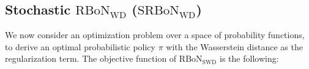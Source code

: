 





\subsection{Stochastic $\mathrm{RBoN}_{\mathrm{WD}}$ ($\mathrm{SRBoN}_{\mathrm{WD}}$)}\label{propose:WD}
We now consider an optimization problem over a space of probability functions, to derive an optimal probabilistic policy $\pi$ with the Wasserstein distance as the regularization term. 
The objective function of $\mathrm{RBoN}_{\mathrm{SWD}}$ is the following:

